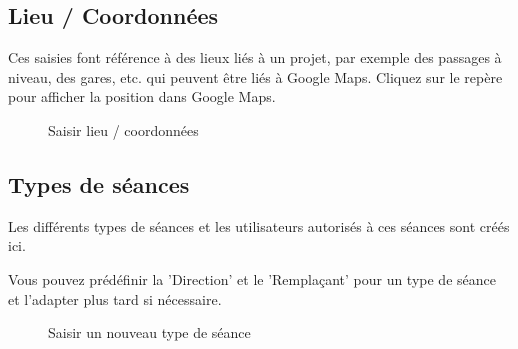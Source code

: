 \subsection{Lieu / Coordonnées}

Ces saisies font référence à des lieux liés à un projet, par exemple des passages à niveau, des gares, etc. qui peuvent être liés à Google Maps. Cliquez sur le repère pour afficher la position dans Google Maps.

\begin{figure}[H]
\caption{Saisir lieu / coordonnées}
\end{figure}

\clearpage
\subsection{Types de séances}

Les différents types de séances et les utilisateurs autorisés à ces séances sont créés ici.

\vspace{\baselineskip}


Vous pouvez prédéfinir la 'Direction' et le 'Remplaçant' pour un type de séance et l'adapter 
plus tard si nécessaire.

\begin{figure}[H]
\caption{Saisir un nouveau type de séance}
\end{figure}

